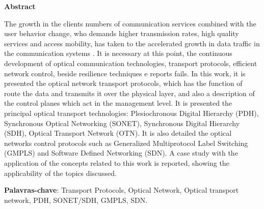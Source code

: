 \newpage \thispagestyle{plain} 
\vspace{1.5cm}
\begin{center}
{\huge{\textbf{Abstract}}}
\end{center}
\vspace{0.5cm}

The growth in the clients numbers of communication services combined with the user behavior change, who demands
higher transmission rates, high quality services and access mobility, has taken to the accelerated growth in data traffic in the communication systems . It is necessary at this point, the continuous development of optical
communication technologies, transport protocols, efficient network control, beside resilience techniques e reports fails. In this work, it is presented the optical network transport protocols, which has the function of route the
data and transmits it over the physical layer, and also a description of the control planes which act in the management level. It is presented the principal optical transport technologies: Plesiochronous Digital Hierarchy
(PDH), Synchronous Optical Networking (SONET), Synchronous Digital Hierarchy (SDH), Optical Transport Network
(OTN). It is also detailed the optical networks control protocols such as Generalized Multiprotocol Label Switching
(GMPLS) and Software Defined Networking (SDN). A case study with the application of the concepts related to this
work is reported, showing the applicability of the topics discussed.

\vspace{1.5ex}

\textbf{Palavras-chave}: Transport Protocols, Optical Network, Optical transport network, PDH, SONET/SDH, GMPLS, SDN.
